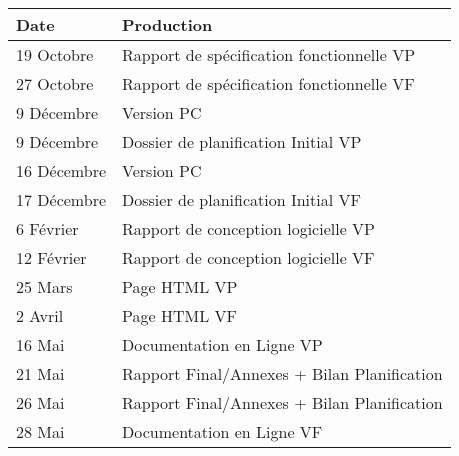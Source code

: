 \begin{tabular}{|l|l|}
\hline
  Date &
  Production \\
\hline
  19 Octobre &
  Rapport de spécification fonctionnelle VP \\
\hline
  27 Octobre &
  Rapport de spécification fonctionnelle VF \\
\hline
  9 Décembre &
  Version PC \textnumero1 \\
\hline
  9 Décembre &
  Dossier de planification Initial VP \\
\hline
  16 Décembre &
  Version PC \textnumero2 \\
\hline
  17 Décembre &
  Dossier de planification Initial VF \\
\hline
  6 Février &
  Rapport de conception logicielle VP \\
\hline
  12 Février &
  Rapport de conception logicielle VF \\
\hline
  25 Mars &
  Page HTML VP \\
\hline
  2 Avril &
  Page HTML VF \\
\hline
  16 Mai &
  Documentation en Ligne VP \\
\hline
  21 Mai &
  Rapport Final/Annexes + Bilan Planification \\
\hline
  26 Mai &
  Rapport Final/Annexes + Bilan Planification \\
\hline
  28 Mai &
  Documentation en Ligne VF \\
\hline
\end{tabular}


